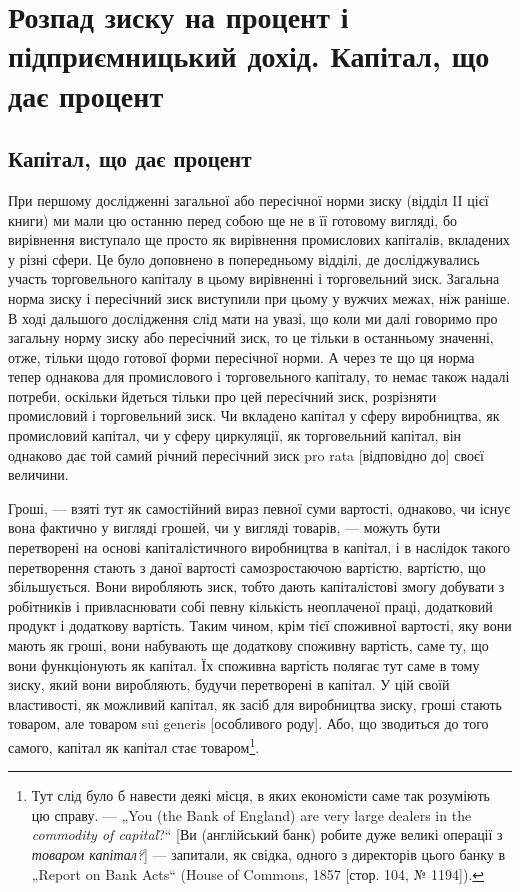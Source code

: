 
\chapter{Розпад зиску на процент і підприємницький
дохід. Капітал, що дає процент}

\section{Капітал, що дає процент}

При першому дослідженні загальної або пересічної норми
зиску (відділ II цієї книги) ми мали цю останню перед собою
ще не в її готовому вигляді, бо вирівнення виступало ще просто
як вирівнення промислових капіталів, вкладених у різні сфери.
Це було доповнено в попередньому відділі, де досліджувались
участь торговельного капіталу в цьому вирівненні і торговельний
зиск. Загальна норма зиску і пересічний зиск виступили
при цьому у вужчих межах, ніж раніше. В ході дальшого
дослідження слід мати на увазі, що коли ми далі говоримо
про загальну норму зиску або пересічний зиск, то це тільки
в останньому значенні, отже, тільки щодо готової форми пересічної
норми. А через те що ця норма тепер однакова для промислового
і торговельного капіталу, то немає також надалі
потреби, оскільки йдеться тільки про цей пересічний зиск,
розрізняти промисловий і торговельний зиск. Чи вкладено капітал
у сферу виробництва, як промисловий капітал, чи у сферу циркуляції,
як торговельний капітал, він однаково дає той самий
річний пересічний зиск pro rata [відповідно до] своєї величини.

Гроші, — взяті тут як самостійний вираз певної суми вартості,
однаково, чи існує вона фактично у вигляді грошей, чи у
вигляді товарів, — можуть бути перетворені на основі капіталістичного
виробництва в капітал, і в наслідок такого перетворення
стають з даної вартості самозростаючою вартістю, вартістю,
що збільшується. Вони виробляють зиск, тобто дають
капіталістові змогу добувати з робітників і привласнювати собі
певну кількість неоплаченої праці, додатковий продукт і додаткову
вартість. Таким чином, крім тієї споживної вартості, яку
вони мають як гроші, вони набувають ще додаткову споживну
вартість, саме ту, що вони функціонують як капітал. Їх споживна
вартість полягає тут саме в тому зиску, який вони виробляють,
будучи перетворені в капітал. У цій своїй властивості,
як можливий капітал, як засіб для виробництва зиску, гроші
стають товаром, але товаром sui generis [особливого роду].
Або, що зводиться до того самого, капітал як капітал стає
товаром\footnote{
Тут слід було б навести деякі місця, в яких економісти саме так розуміють
цю справу. — „You (the Bank of England) are very large dealers in the
\emph{commodity of capital}?“ [Ви (англійський банк) робите дуже великі операції
з \emph{товаром капітал?}] — запитали, як свідка, одного з директорів цього банку
в „Report on Bank Acts“ (House of Commons, 1857 [стор. 104, № 1194]).
}.

